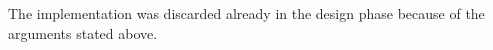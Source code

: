 
The implementation was discarded already in the design phase because of the arguments stated above.
